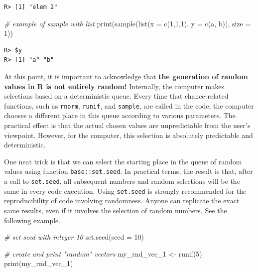\documentclass[
  12pt,
]{book}
\newenvironment{Shaded}{\begin{snugshade}}{\end{snugshade}}
\newcommand{\AttributeTok}[1]{\textcolor[rgb]{0.61,0.61,0.61}{#1}}
\newcommand{\CommentTok}[1]{\textcolor[rgb]{0.37,0.37,0.37}{\textit{#1}}}
\newcommand{\DecValTok}[1]{\textcolor[rgb]{0.06,0.06,0.06}{#1}}
\newcommand{\FunctionTok}[1]{\textcolor[rgb]{0,0,0}{#1}}
\newcommand{\NormalTok}[1]{#1}
\newcommand{\OtherTok}[1]{\textcolor[rgb]{0.37,0.37,0.37}{#1}}
\newcommand{\StringTok}[1]{\textcolor[rgb]{0.5,0.5,0.5}{#1}}
\begin{document}
\begin{verbatim}
R> [1] "elem 2"
\end{verbatim}

\begin{Shaded}
\begin{Highlighting}[]
\CommentTok{\# example of sample with list}
\FunctionTok{print}\NormalTok{(}\FunctionTok{sample}\NormalTok{(}\FunctionTok{list}\NormalTok{(}\AttributeTok{x =} \FunctionTok{c}\NormalTok{(}\DecValTok{1}\NormalTok{,}\DecValTok{1}\NormalTok{,}\DecValTok{1}\NormalTok{),}
                  \AttributeTok{y =} \FunctionTok{c}\NormalTok{(}\StringTok{\textquotesingle{}a\textquotesingle{}}\NormalTok{, }\StringTok{\textquotesingle{}b\textquotesingle{}}\NormalTok{)),}
             \AttributeTok{size =} \DecValTok{1}\NormalTok{))}
\end{Highlighting}
\end{Shaded}

\begin{verbatim}
R> $y
R> [1] "a" "b"
\end{verbatim}

At this point, it is important to acknowledge that \textbf{the generation of random values in R is not entirely random!} Internally, the computer makes selections based on a deterministic queue. Every time that chance-related functions, such as \texttt{rnorm}, \texttt{runif}, and \texttt{sample}, are called in the code, the computer chooses a different place in this queue according to various parameters. The practical effect is that the actual chosen values are unpredictable from the user's viewpoint. However, for the computer, this selection is absolutely predictable and deterministic.

One neat trick is that we can select the starting place in the queue of random values using function \texttt{base::set.seed}. In practical terms, the result is that, after a call to \texttt{set.seed}, all subsequent numbers and random selections will be the same in every code execution. Using \texttt{set.seed} is strongly recommended for the reproducibility of code involving randomness. Anyone can replicate the exact same results, even if it involves the selection of random numbers. See the following example. 

\begin{Shaded}
\begin{Highlighting}[]
\CommentTok{\# set seed with integer 10}
\FunctionTok{set.seed}\NormalTok{(}\AttributeTok{seed =} \DecValTok{10}\NormalTok{)}

\CommentTok{\# create and print "random" vectors}
\NormalTok{my\_rnd\_vec\_1 }\OtherTok{\textless{}{-}} \FunctionTok{runif}\NormalTok{(}\DecValTok{5}\NormalTok{)}
\FunctionTok{print}\NormalTok{(my\_rnd\_vec\_1)}
\end{Highlighting}
\end{Shaded}
\end{document}
